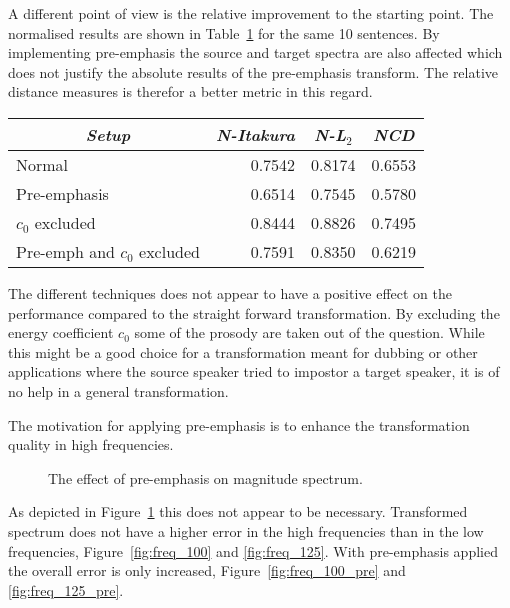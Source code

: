 A different point of view is the relative improvement to the starting point. The normalised results are shown in Table~\ref{tab:normalised_freq_results} for the same 10 sentences. By implementing pre-emphasis the source and target spectra are also affected which does not justify the absolute results of the pre-emphasis transform. The relative distance measures is therefor a better metric in this regard.
\begin{table}[htbp]
	\begin{center}
		\label{tab:normalised_freq_results}
		\begin{tabular}{lrrr}
			\toprule
			\multicolumn{1}{c}{\emph{Setup}} & \multicolumn{1}{c}{\emph{N-Itakura}} & \multicolumn{1}{c}{\emph{N-L$_2$}} & \multicolumn{1}{c}{\emph{NCD}}\\
			\midrule
			Normal & 0.7542 & 0.8174 & 0.6553 \\
			Pre-emphasis &  0.6514 & 0.7545 & 0.5780 \\
			$c_0$ excluded & 0.8444 & 0.8826 & 0.7495 \\
			Pre-emph and $c_0$ excluded & 0.7591 & 0.8350 & 0.6219 \\
			\bottomrule			
		\end{tabular}		
	\end{center}	
\end{table}
The different techniques does not appear to have a positive effect on the performance compared to the straight forward transformation. By excluding the energy coefficient $c_0$ some of the prosody are taken out of the question. While this might be a good choice for a transformation meant for dubbing or other applications where the source speaker tried to impostor a target speaker, it is of no help in a general transformation.

The motivation for applying pre-emphasis is to enhance the transformation quality in high frequencies.
\begin{figure}[htbp]
	\begin{center}
	\caption{The effect of pre-emphasis on magnitude spectrum.}
	\label{fig:pre_emphasis_magnitude_spectrum}
	\end{center}
\end{figure}
As depicted in Figure~\ref{fig:pre_emphasis_magnitude_spectrum} this does not appear to be necessary. Transformed spectrum does not have a higher error in the high frequencies than in the low frequencies, Figure~\ref{fig:freq_100} and \ref{fig:freq_125}. With pre-emphasis applied the overall error is only increased, Figure~\ref{fig:freq_100_pre} and \ref{fig:freq_125_pre}.

